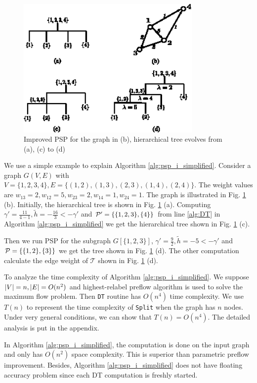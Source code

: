 \documentclass[runningheads]{llncs}
\begin{document}
\begin{figure}[!ht]
	\centering
	\includegraphics[width=9cm]{pic/alg_illustration.eps}
	\caption{Improved PSP for the graph in (b), hierarchical tree evolves from (a), (c) to (d) }\label{fig:alg_eg}
\end{figure}

\begin{example}
	We use a simple example to explain Algorithm \ref{alg:psp_i_simplified}. Consider a graph $G(V, E)$ with $V=\{1,2,3,4\}, E=\{(1,2),(1,3),(2,3),(1,4),(2,4)\}$. The weight values are $w_{13}=2, w_{12}=5, w_{23}=2, w_{14}=1, w_{24}=1$. The graph is illustrated
	in Fig. \ref{fig:alg_eg} (b). Initially, the hierarchical tree is shown in Fig. \ref{fig:alg_eg} (a). Computing $\gamma' = \frac{11}{4-1}, \tilde{h} = -\frac{16}{3} < -\gamma' $ and $\P' = \{\{1,2,3\},\{4\}\}$ from line \ref {alg:DT} in Algorithm \ref{alg:psp_i_simplified} we get the hierarchical tree shown in Fig. \ref{fig:alg_eg} (c).
	
	Then we run PSP for the subgraph $G[\{1,2,3\}]$, $\gamma' = \frac{9}{2}, \tilde{h} = -5 < -\gamma'$ and $\P= \{\{1,2\},\{3\}\}$ we get the tree shown in Fig. \ref{fig:alg_eg} (d). The other computation calculate the edge weight of $\mathcal{T}$ shown in Fig. \ref{fig:alg_eg} (d).
\end{example}		

To analyze the time complexity of Algorithm \ref{alg:psp_i_simplified}. We suppose $\abs{V} = n, \abs{E} = O(n^2)$ and highest-relabel preflow algorithm is used to solve the maximum flow problem. Then \texttt{DT} routine has $O(n^4)$ time complexity. 
We use $T(n)$ to represent the time complexity of \texttt{Split} when the graph has $n$ nodes. Under very general conditions, we can show that $T(n) = O(n^4)$. The detailed analysis is put in the appendix.

In Algorithm \ref{alg:psp_i_simplified}, the computation is done on the input graph and only has $O(n^2)$ space complexity. This is superior than parametric preflow improvement. Besides, Algorithm \ref{alg:psp_i_simplified} does not have floating accuracy problem since each DT computation is freshly started. 
\end{document}
